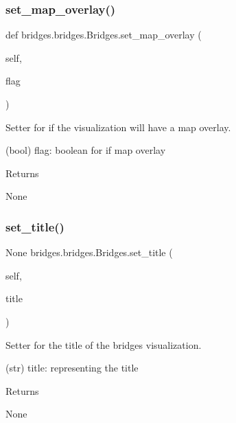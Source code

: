 \subsubsection{\texorpdfstring{set\_map\_overlay()}{set\_map\_overlay()}}
{\footnotesize\ttfamily def bridges.\+bridges.\+Bridges.\+set\+\_\+map\+\_\+overlay (\begin{DoxyParamCaption}\item[{}]{self,  }\item[{}]{flag }\end{DoxyParamCaption})}



Setter for if the visualization will have a map overlay. 

\begin{DoxyVerb}       (bool) flag: boolean for if map overlay
\end{DoxyVerb}
 \begin{DoxyReturn}{Returns}


None 
\end{DoxyReturn}
\mbox{\label{classbridges_1_1bridges_1_1_bridges_a46ecfa60298f97bd7605f1e224cfab10}} 
\subsubsection{\texorpdfstring{set\_title()}{set\_title()}}
{\footnotesize\ttfamily  None bridges.\+bridges.\+Bridges.\+set\+\_\+title (\begin{DoxyParamCaption}\item[{}]{self,  }\item[{}]{title }\end{DoxyParamCaption})}



Setter for the title of the bridges visualization. 

\begin{DoxyVerb}       (str) title: representing the title
\end{DoxyVerb}
 \begin{DoxyReturn}{Returns}


None 
\end{DoxyReturn}
\mbox{\label{classbridges_1_1bridges_1_1_bridges_ab50d018b5178ca33de24157b7b6de285}} 
